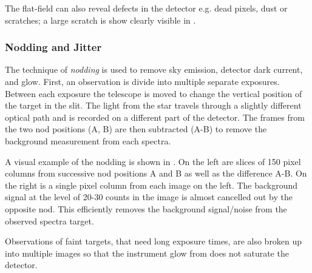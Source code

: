 The flat-field can also reveal defects in the detector e.g. dead pixels, dust or scratches; a large scratch is show clearly visible in .

\subsubsection{Nodding and Jitter}
\label{subsec:nod-jitter}
The technique of \emph{nodding} is used to remove sky emission, detector dark current, and glow. First, an observation is divide into multiple separate exposures. Between each exposure the telescope is moved to change the vertical position of the target in the slit. The light from the star travels through a slightly different optical path and is recorded on a different part of the detector. The frames from the two nod positions (A, B) are then subtracted (A-B) to remove the background measurement from each spectra.

A visual example of the nodding is shown in . On the left are slices of 150 pixel columns from successive nod positions A and B as well as the difference A-B. On the right is a single pixel column from each image on the left. The background signal at the level of 20-30 counts in the image is almost cancelled out by the opposite nod. This efficiently removes the background signal/noise from the observed spectra target.

Observations of faint targets, that need long exposure times, are also broken up into multiple images so that the instrument glow from  does not saturate the detector.


